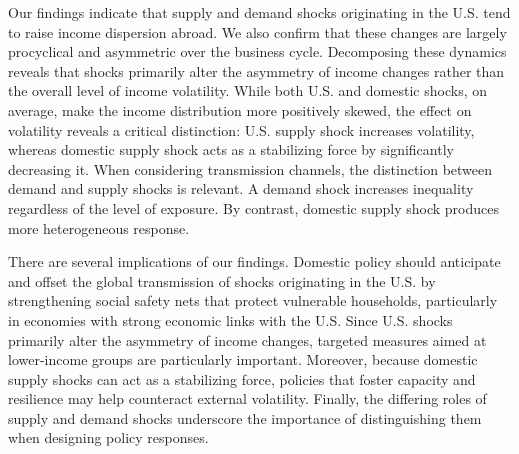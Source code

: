\documentclass[12pt, a4paper]{article}
\begin{document}
Our findings indicate that supply and demand shocks originating in the U.S. tend to raise income dispersion abroad. We also confirm that these changes are largely procyclical and asymmetric over the business cycle. Decomposing these dynamics reveals that shocks primarily alter the asymmetry of income changes rather than the overall level of income volatility. While both U.S. and domestic shocks, on average, make the income distribution more positively skewed, the effect on volatility reveals a critical distinction: U.S. supply shock increases volatility, whereas domestic supply shock acts as a stabilizing force by significantly decreasing it. When considering transmission channels, the distinction between demand and supply shocks is relevant. A demand shock increases inequality regardless of the level of exposure. By contrast, domestic supply shock produces more heterogeneous response.

There are several implications of our findings. Domestic policy should anticipate and offset the global transmission of shocks originating in the U.S. by strengthening social safety nets that protect vulnerable households, particularly in economies with strong economic links with the U.S. Since U.S. shocks primarily alter the asymmetry of income changes, targeted measures aimed at lower-income groups are particularly important. Moreover, because domestic supply shocks can act as a stabilizing force, policies that foster capacity and resilience may help counteract external volatility. Finally, the differing roles of supply and demand shocks underscore the importance of distinguishing them when designing policy responses.
\end{document}
